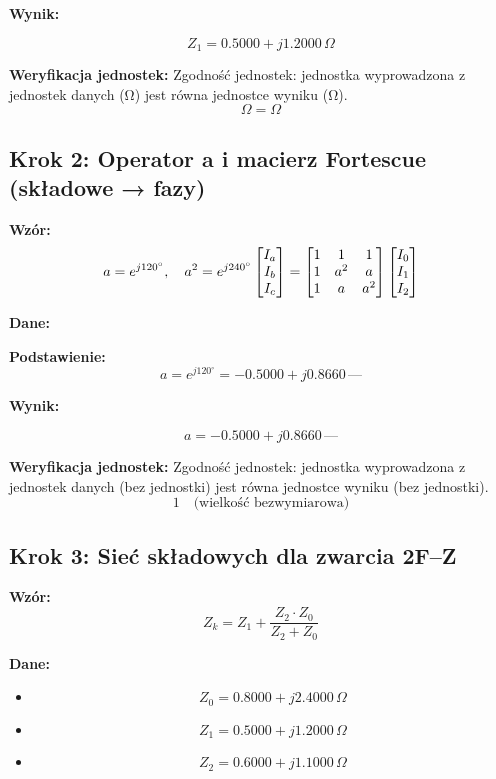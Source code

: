\documentclass[11pt,a4paper]{article}
\begin{document}
\textbf{Wynik:}
\begin{center}
$$
Z_1 = 0.5000 + j1.2000\,\Omega
$$
\end{center}

\textbf{Weryfikacja jednostek:} Zgodność jednostek: jednostka wyprowadzona z jednostek danych (Ω) jest równa jednostce wyniku (Ω).
$$
\Omega = \Omega
$$

\subsection{Krok 2: Operator a i macierz Fortescue (składowe → fazy)}

\textbf{Wzór:}
$$
a = e^{j 120^\circ}, \quad a^2 = e^{j 240^\circ} \\\begin{bmatrix} I_a \\ I_b \\ I_c \end{bmatrix} =\begin{bmatrix} 1 & 1 & 1 \\ 1 & a^2 & a \\ 1 & a & a^2 \end{bmatrix}\begin{bmatrix} I_0 \\ I_1 \\ I_2 \end{bmatrix}
$$

\textbf{Dane:}
\begin{itemize}
\end{itemize}

\textbf{Podstawienie:}
$$
a = e^{j 120^\circ} = -0.5000 + j0.8660\,\text{—}
$$

\textbf{Wynik:}
\begin{center}
$$
a = -0.5000 + j0.8660\,\text{—}
$$
\end{center}

\textbf{Weryfikacja jednostek:} Zgodność jednostek: jednostka wyprowadzona z jednostek danych (bez jednostki) jest równa jednostce wyniku (bez jednostki).
$$
1 \quad \text{(wielkość bezwymiarowa)}
$$

\subsection{Krok 3: Sieć składowych dla zwarcia 2F–Z}

\textbf{Wzór:}
$$
Z_k = Z_1 + \frac{Z_2 \cdot Z_0}{Z_2 + Z_0}
$$

\textbf{Dane:}
\begin{itemize}
  \item
$$
Z_0 = 0.8000 + j2.4000\,\Omega
$$
  \item
$$
Z_1 = 0.5000 + j1.2000\,\Omega
$$
  \item
$$
Z_2 = 0.6000 + j1.1000\,\Omega
$$
\end{itemize}
\end{document}
